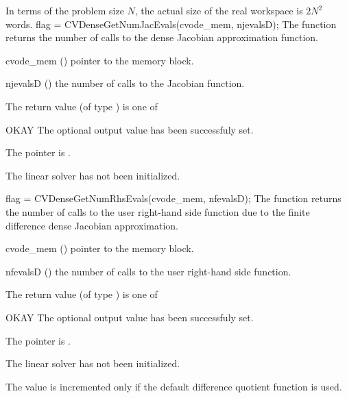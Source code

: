 {
  In terms of the problem size $N$, the actual size of the real workspace
  is $2N^2$  words.
}
{
  flag = CVDenseGetNumJacEvals(cvode\_mem, njevalsD);
}
{
  The function  returns the
  number of calls to the dense Jacobian approximation function.
}
{
  \begin{args}
  \item[cvode\_mem] ()
    pointer to the {\cvode} memory block.
  \item[njevalsD] ()
    the number of calls to the Jacobian function.
  \end{args}
}
{
  The return value  (of type ) is one of
  \begin{args}
  \item[OKAY] 
    The optional output value has been successfuly set.
  \item[\Id{LIN\_NO\_MEM}]
    The  pointer is .
  \item[\Id{LIN\_NO\_LMEM}]
    The {\cvdense} linear solver has not been initialized.
  \end{args}
}
{}
{
  flag = CVDenseGetNumRhsEvals(cvode\_mem, nfevalsD);
}
{
  The function  returns the
  number of calls to the user right-hand side function due to the 
  finite difference dense Jacobian approximation.
}
{
  \begin{args}
  \item[cvode\_mem] ()
    pointer to the {\cvode} memory block.
  \item[nfevalsD] ()
    the number of calls to the user right-hand side function.
  \end{args}
}
{
  The return value  (of type ) is one of
  \begin{args}
  \item[OKAY] 
    The optional output value has been successfuly set.
  \item[\Id{LIN\_NO\_MEM}]
    The  pointer is .
  \item[\Id{LIN\_NO\_LMEM}]
    The {\cvdense} linear solver has not been initialized.
  \end{args}
}
{
  The value  is incremented only if the default 
   difference quotient function is used.
}
